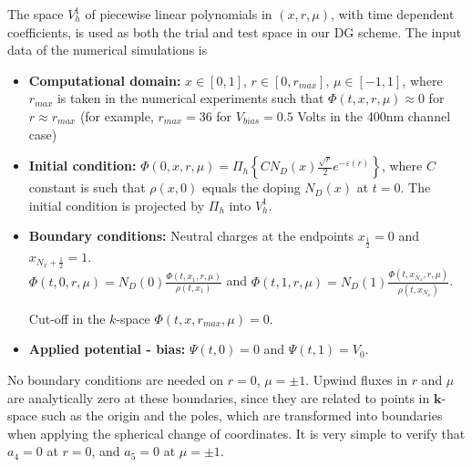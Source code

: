 \documentclass[11pt]{article}
\newcommand{\bk}{\mathbf{k}}
\newcommand{\dm}{\displaystyle}
\begin{document}
The space $V_h^1$ of piecewise linear polynomials in $(x,r,\mu)$, with time dependent coefficients,
is used as both the trial and test space in our DG scheme. The input data of the numerical simulations is


\begin{itemize}
\item 
{\bf Computational domain:} %
$ x \in [0,1], \, r \in [0,r_{max}], \, \mu \in [-1,1] $,
where $r_{max}$ is taken in the numerical experiments such that
$ \Phi(t,x,r,\mu) \approx 0$ \mbox{for} $ r \approx r_{max} $ 
(for example, $r_{max}=36$ for $V_{bias} = 0.5$ Volts in the 400nm channel case)
\item
{\bf Initial condition:} %
$\dm \Phi(0, x, r,\mu) = \Pi_h \left\lbrace C N_D(x) \frac{\sqrt{r}}{2} e^{-\varepsilon(r)} \right\rbrace $, 
where $C$ constant is such that $\rho(x,0)$ equals the doping $ N_D(x) $ at $t=0$. The initial condition is projected by $\Pi_h $ into $V_h^1$.
\item
{\bf Boundary conditions:} %
Neutral charges at the endpoints $x_{\frac{1}{2}} = 0$ and $x_{N_x+\frac{1}{2}} = 1$. \\[5pt]
$\dm \Phi(t,0,r,\mu) = N_D(0) \frac{\Phi(t,x_1,r,\mu)}{\rho(t,x_1)}$
and
$\dm \Phi(t,1,r,\mu) = N_D(1) \frac{\Phi(t,x_{N_x},r,\mu)}{\rho(t,x_{N_x})}$.

Cut-off in the $k$-space $\dm \Phi(t,x,r_{max},\mu) = 0$.
\item
{\bf Applied potential - bias:} %
$\dm \Psi(t,0)=0$ and $\dm \Psi(t,1) = V_0$.
\end{itemize}
%
No boundary conditions are needed on $r=0$, $\mu = \pm 1$.
Upwind fluxes in $r$ and $\mu$ are analytically zero at these boundaries, since they are 
related to points in
$\bk$-space such as the origin and the poles, which are transformed into boundaries when applying the spherical 
change of coordinates.
It is very simple to verify that $a_4 = 0$ at $r = 0$, and $a_5 = 0$ at $\mu = \pm 1$.
%
%
\end{document}
